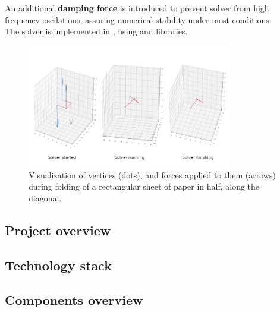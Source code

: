 An additional \textbf{damping force} is introduced to prevent solver from
high frequency oscilations, assuring numerical stability under most conditions.\\

The solver is implemented in , using  and  libraries. 


\begin{figure}[H]
	\caption{Visualization of vertices (dots), and forces applied to them (arrows)
	during folding of a rectangular sheet of paper in half, along the diagonal. }
  \centering
    \includegraphics[width=0.8\textwidth]{assets/prototype-backend.png}
\end{figure}


\subsection{Project overview}

\subsection{Technology stack}

\subsection{Components overview}

